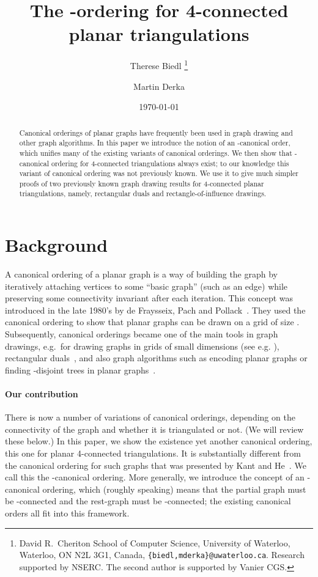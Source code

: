 \documentclass[12pt]{article}
\title{The -ordering for 4-connected planar triangulations}
\author{Therese Biedl
\thanks{David R.~Cheriton School of Computer Science, 
University of Waterloo, 
Waterloo, ON N2L 3G1, Canada, {\tt \{biedl,mderka\}@uwaterloo.ca}. Research supported by NSERC. The second author is supported by Vanier CGS. }
\and
Martin Derka
\addtocounter{footnote}{-1}
\footnotemark
}
\date{\today}
\begin{document}
\maketitle

\begin{abstract}
Canonical orderings of planar graphs have frequently been used in graph drawing and other graph algorithms. In this paper we introduce the notion of an
-canonical order, which unifies many of the existing variants of
canonical orderings.  We then show that -canonical ordering
for 4-connected triangulations always exist; to our knowledge
this variant of canonical ordering was not previously known.
We use it to give much simpler proofs of two previously known graph drawing 
results for 4-connected planar triangulations, namely, rectangular duals 
and rectangle-of-influence drawings.
\end{abstract}


\section{Background}
\label{se:intro}


A canonical ordering of a planar graph is a way of building the graph by iteratively attaching vertices to some ``basic graph'' (such as an edge) while preserving some connectivity invariant after each iteration. This concept was introduced in the late 1980's by de Fraysseix, Pach and Pollack~\cite{FPP90}. They used the canonical ordering to show that planar graphs can be drawn on a grid of size . Subsequently, canonical orderings became one of the main tools in graph drawings, e.g.~for drawing graphs in grids of small dimensions (see e.g. \cite{FPP90,CN98}), rectangular duals~\cite{KH97}, and also graph algorithms such as encoding planar graphs \cite{HKL99} or finding -disjoint trees in planar graphs~\cite{NRN97,NN00}. 


\paragraph{Our contribution}
There is now a number of variations of canonical orderings, depending on
the connectivity of the graph and whether it is triangulated or not.  (We
will review these below.)
In this paper, we show the existence yet another canonical ordering, this one  for planar 4-connected triangulations.  It is substantially different from the canonical ordering for such graphs that was presented by Kant and He~\cite{KH97}. 
We call this the -canonical ordering.  More generally, we introduce
the concept of an -canonical ordering, which (roughly speaking) means
that the partial graph must be -connected and the rest-graph must be
-connected; the existing canonical orders all fit into this framework.
\end{document}
